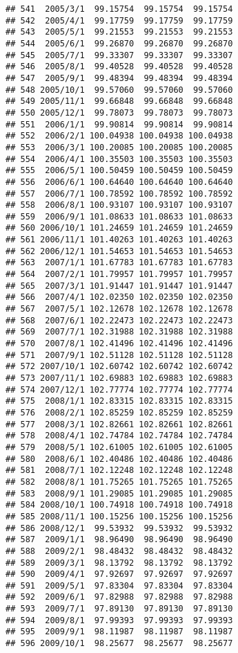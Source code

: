 \documentclass[
]{article}
\begin{document}
\begin{verbatim}
## 541  2005/3/1  99.15754  99.15754  99.15754
## 542  2005/4/1  99.17759  99.17759  99.17759
## 543  2005/5/1  99.21553  99.21553  99.21553
## 544  2005/6/1  99.26870  99.26870  99.26870
## 545  2005/7/1  99.33307  99.33307  99.33307
## 546  2005/8/1  99.40528  99.40528  99.40528
## 547  2005/9/1  99.48394  99.48394  99.48394
## 548 2005/10/1  99.57060  99.57060  99.57060
## 549 2005/11/1  99.66848  99.66848  99.66848
## 550 2005/12/1  99.78073  99.78073  99.78073
## 551  2006/1/1  99.90814  99.90814  99.90814
## 552  2006/2/1 100.04938 100.04938 100.04938
## 553  2006/3/1 100.20085 100.20085 100.20085
## 554  2006/4/1 100.35503 100.35503 100.35503
## 555  2006/5/1 100.50459 100.50459 100.50459
## 556  2006/6/1 100.64640 100.64640 100.64640
## 557  2006/7/1 100.78592 100.78592 100.78592
## 558  2006/8/1 100.93107 100.93107 100.93107
## 559  2006/9/1 101.08633 101.08633 101.08633
## 560 2006/10/1 101.24659 101.24659 101.24659
## 561 2006/11/1 101.40263 101.40263 101.40263
## 562 2006/12/1 101.54653 101.54653 101.54653
## 563  2007/1/1 101.67783 101.67783 101.67783
## 564  2007/2/1 101.79957 101.79957 101.79957
## 565  2007/3/1 101.91447 101.91447 101.91447
## 566  2007/4/1 102.02350 102.02350 102.02350
## 567  2007/5/1 102.12678 102.12678 102.12678
## 568  2007/6/1 102.22473 102.22473 102.22473
## 569  2007/7/1 102.31988 102.31988 102.31988
## 570  2007/8/1 102.41496 102.41496 102.41496
## 571  2007/9/1 102.51128 102.51128 102.51128
## 572 2007/10/1 102.60742 102.60742 102.60742
## 573 2007/11/1 102.69883 102.69883 102.69883
## 574 2007/12/1 102.77774 102.77774 102.77774
## 575  2008/1/1 102.83315 102.83315 102.83315
## 576  2008/2/1 102.85259 102.85259 102.85259
## 577  2008/3/1 102.82661 102.82661 102.82661
## 578  2008/4/1 102.74784 102.74784 102.74784
## 579  2008/5/1 102.61005 102.61005 102.61005
## 580  2008/6/1 102.40486 102.40486 102.40486
## 581  2008/7/1 102.12248 102.12248 102.12248
## 582  2008/8/1 101.75265 101.75265 101.75265
## 583  2008/9/1 101.29085 101.29085 101.29085
## 584 2008/10/1 100.74918 100.74918 100.74918
## 585 2008/11/1 100.15256 100.15256 100.15256
## 586 2008/12/1  99.53932  99.53932  99.53932
## 587  2009/1/1  98.96490  98.96490  98.96490
## 588  2009/2/1  98.48432  98.48432  98.48432
## 589  2009/3/1  98.13792  98.13792  98.13792
## 590  2009/4/1  97.92697  97.92697  97.92697
## 591  2009/5/1  97.83304  97.83304  97.83304
## 592  2009/6/1  97.82988  97.82988  97.82988
## 593  2009/7/1  97.89130  97.89130  97.89130
## 594  2009/8/1  97.99393  97.99393  97.99393
## 595  2009/9/1  98.11987  98.11987  98.11987
## 596 2009/10/1  98.25677  98.25677  98.25677

\end{verbatim}
\end{document}
